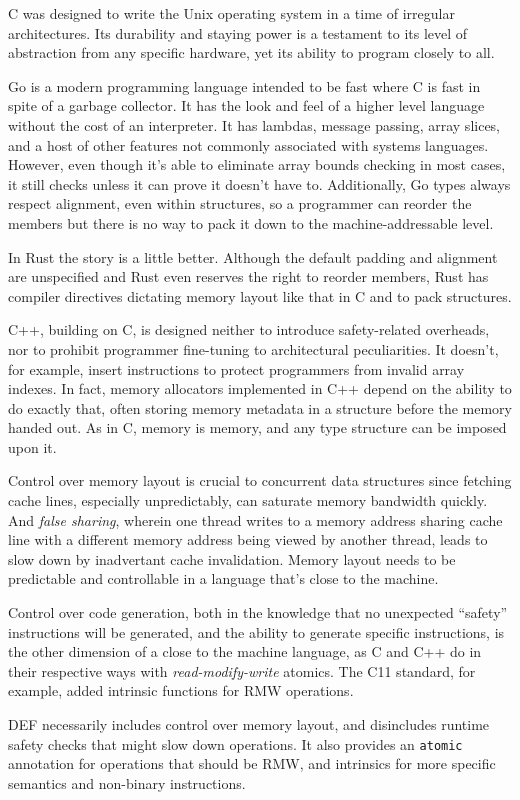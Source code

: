 C was designed to write the Unix operating system in a time of irregular architectures.  Its durability and staying power is a testament to its level of abstraction from any specific hardware, yet its ability to program closely to all.

Go is a modern programming language intended to be fast where C is fast in spite of a garbage collector.\cite{Go}  It has the look and feel of a higher level language without the cost of an interpreter.  It has lambdas, message passing, array slices, and a host of other features not commonly associated with systems languages.  However, even though it's able to eliminate array bounds checking in most cases, it still checks unless it can prove it doesn't have to.  Additionally, Go types always respect alignment, even within structures, so a programmer can reorder the members but there is no way to pack it down to the machine-addressable level.

In Rust the story is a little better. Although the default padding and alignment are unspecified and Rust even reserves the right to reorder members, Rust has compiler directives dictating memory layout like that in C and to pack structures.

C++, building on C, is designed neither to introduce safety-related overheads, nor to prohibit programmer fine-tuning to architectural peculiarities.  It doesn't, for example, insert instructions to protect programmers from invalid array indexes.  In fact, memory allocators implemented in C++ depend on the ability to do exactly that, often storing memory metadata in a structure before the memory handed out.\cite{Hoard, TCMalloc, Supermalloc}  As in C, memory is memory, and any type structure can be imposed upon it.

Control over memory layout is crucial to concurrent data structures since fetching cache lines, especially unpredictably, can saturate memory bandwidth quickly.  And \textit{false sharing}, wherein one thread writes to a memory address sharing cache line with a different memory address being viewed by another thread, leads to slow down by inadvertant cache invalidation.  Memory layout needs to be predictable and controllable in a language that's close to the machine.

Control over code generation, both in the knowledge that no unexpected ``safety'' instructions will be generated, and the ability to generate specific instructions, is the other dimension of a close to the machine language, as C and C++ do in their respective ways with \textit{read-modify-write} atomics.  The C11 standard, for example, added intrinsic functions for RMW operations.\cite{C11Atomics}

DEF necessarily includes control over memory layout, and disincludes runtime safety checks that might slow down operations.  It also provides an \texttt{atomic} annotation for operations that should be RMW, and intrinsics for more specific semantics and non-binary instructions.
